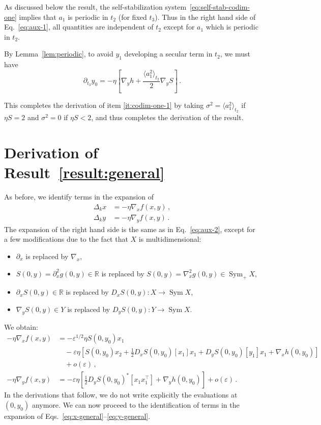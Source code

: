 \documentclass[11pt,english,reqno]{article}
\DeclareMathOperator{\Sym}{Sym}
\newcommand{\R}{\mathbb{R}}
\theoremstyle{plain}
\theoremstyle{definition}
\theoremstyle{remark}
\numberwithin{equation}{section}
\begin{document}
\begin{itemize}
            As discussed below the result, the self-stabilization system~\eqref{eq:self-stab-codim-one} implies that $a_1$ is periodic in $t_2$ (for fixed $t_3$). Thus in the right hand side of Eq.~\eqref{eq:aux-1}, all quantities are independent of $t_2$ except for $a_1$ which is periodic in $t_2$. 

            By Lemma~\ref{lem:periodic}, to avoid $y_1$ developing a secular term in $t_2$, we must have 
            \begin{equation*}
                \partial_{t_3} y_0 = - \eta \left[\nabla_y h + \frac{\langle a_1^2 \rangle_{t_2}}{2}  \nabla_y S\right] \, .
            \end{equation*}
            \end{itemize}
            This completes the derivation of item \ref{it:codim-one-1} by taking $\sigma^2 = \langle a_1^2 \rangle_{t_2}$ if $\eta S =2$ and $\sigma^2 = 0$ if $\eta S < 2$, and thus completes the derivation of the result.

\section{Derivation of Result~\ref{result:general}}
\label{sec:derivation-general}

    As before, we identify terms in the expansion of
    \begin{align}
        \Delta_k x &= -\eta \nabla_x f(x,y) \, , \label{eq:x-general} \\
        \Delta_k y &= -\eta \nabla_y f(x,y) \, . \label{eq:y-general}
    \end{align}
    The expansion of the right hand side is the same as in Eq.~\eqref{eq:aux-2}, except for a few modifications due to the fact that $X$ is multidimensional: 
    \begin{itemize}
        \item $\partial_x$ is replaced by $\nabla_x$,
        \item $S(0,y) = \partial^2_{x} g(0,y) \in \R$ is replaced by $S(0,y) = \nabla^2_{x} g(0,y) \in \Sym_+ X$,
        \item $\partial_x S(0,y) \in \R$ is replaced by $D_x S(0,y) : X \to \Sym X$,
        \item $\nabla_y S(0,y) \in Y$ is replaced by $D_y S(0,y) : Y \to \Sym X$. 
    \end{itemize} 
    We obtain:
    \begin{align*}
        -\eta \nabla_x f(x,y) &= - \varepsilon^{1/2} \eta S(0,y_0) x_1 \\
        &\quad- \varepsilon \eta \left[S(0,y_0) x_2 + \frac{1}{2} D_x S(0,y_0)[x_1] x_1 + D_y S(0,y_0)[y_1] x_1 + \nabla_x h(0,y_0)\right] \\
        &\quad+ o(\varepsilon) \, , \\
        -\eta \nabla_y f(x,y) &= - \varepsilon \eta \left[\frac{1}{2} D_y S(0,y_0)^*[x_1 x_1^\top] + \nabla_y h(0,y_0)\right] + o(\varepsilon) \, .
    \end{align*}
    In the derivations that follow, we do not write explicitly the evaluations at $(0,y_0)$ anymore. We can now proceed to the identification of terms in the expansion of Eqs.~\eqref{eq:x-general}--\eqref{eq:y-general}. 
\end{document}
